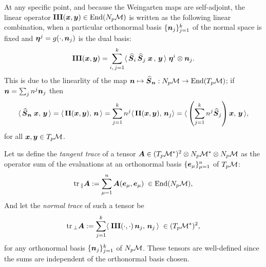 \documentclass[letterpaper, reqno, 11pt]{amsart}
\theoremstyle{definition}
\theoremstyle{remark}
\numberwithin{equation}{section}
\begin{document}
At any specific point, and because the Weingarten maps are self-adjoint, the linear operator $\boldsymbol{\mathrm{III}}(\boldsymbol{x},\boldsymbol{y})\in\text{End}(N_p{\mathcal M})$ is written as the following linear combination, when a particular orthonormal basis $\{\boldsymbol{n}_j\}_{j=1}^k$ of the normal space is fixed and $\boldsymbol{\eta}^j=g(\cdot,\boldsymbol{n}_j)$ is the dual basis:
\begin{equation}
	\boldsymbol{\mathrm{III}}(\boldsymbol{x},\boldsymbol{y}) = \sum_{i,\, j=1}^k \langle\,\boldsymbol{\widehat{S}}_i\,\boldsymbol{\widehat{S}}_j\;\boldsymbol{x}\, ,\,\boldsymbol{y}\,\rangle\;\boldsymbol{\eta}^i\otimes\boldsymbol{n}_j.
\end{equation}
This is due to the linearlity of the map $\boldsymbol{n}\mapsto\boldsymbol{\widehat{S}}_{\boldsymbol{n}}:N_p{\mathcal M}\rightarrow\text{End}(T_p{\mathcal M})$; if $\boldsymbol{n}=\sum_j n^j\boldsymbol{n}_j$ then
$$
\langle\,\boldsymbol{\widehat{S}}_{\boldsymbol{n}}\;\boldsymbol{x} ,\,\boldsymbol{y}\,\rangle = \langle\,\boldsymbol{\mathrm{II}}(\boldsymbol{x},\boldsymbol{y}),\,\boldsymbol{n}\,\rangle = \sum_{j=1}^k n^j\langle\,\boldsymbol{\mathrm{II}}(\boldsymbol{x},\boldsymbol{y}),\,\boldsymbol{n}_j\rangle =\langle\,\left(\sum_{j=1}^k n^j\boldsymbol{\widehat{S}}_j\right)\boldsymbol{x},\,\boldsymbol{y}\,\rangle,
$$ 
for all $\boldsymbol{x},\boldsymbol{y}\in T_p{\mathcal M}$.

Let us define the \emph{tangent trace} of a tensor $\boldsymbol{A}\in (T_p{\mathcal M}^*)^2\otimes N_p{\mathcal M}^*\otimes N_p{\mathcal M}$ as the operator sum of the evaluations at an orthonormal basis $\{\boldsymbol{e}_\mu\}_{\mu=1}^n$ of $T_p{\mathcal M}$:
\begin{equation}
	\mathrm{tr}\,_\parallel\boldsymbol{A} := \sum_{\mu=1}^n \boldsymbol{A}(\boldsymbol{e}_\mu,\boldsymbol{e}_\mu) \; \in\text{End}(N_p{\mathcal M}),
\end{equation}
And let the \emph{normal trace} of such a tensor be 
\begin{equation}
	\mathrm{tr}\,_\perp\boldsymbol{A} := \sum_{j=1}^k \langle\; \boldsymbol{\mathrm{III}}(\cdot,\cdot)\,\boldsymbol{n}_j,\,\boldsymbol{n}_j\,\rangle\;\in (T_p{\mathcal M}^*)^2,
\end{equation}
for any orthonormal basis $\{\boldsymbol{n}_j\}_{j=1}^k$ of $N_p{\mathcal M}$. These tensors are well-defined since the sums are independent of the orthonormal basis chosen.
\end{document}
